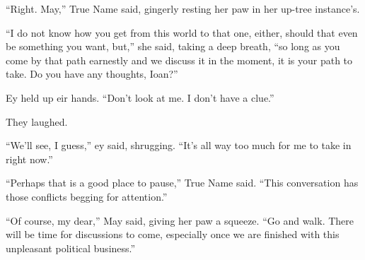 ``Right. May,'' True Name said, gingerly resting her paw in her up-tree instance's.

``I do not know how you get from this world to that one, either, should that even be something you want, but,'' she said, taking a deep breath, ``so long as you come by that path earnestly and we discuss it in the moment, it is your path to take. Do you have any thoughts, Ioan?''

Ey held up eir hands. ``Don't look at me. I don't have a clue.''

They laughed.

``We'll see, I guess,'' ey said, shrugging. ``It's all way too much for me to take in right now.''

``Perhaps that is a good place to pause,'' True Name said. ``This conversation has those conflicts begging for attention.''

``Of course, my dear,'' May said, giving her paw a squeeze. ``Go and walk. There will be time for discussions to come, especially once we are finished with this unpleasant political business.''
